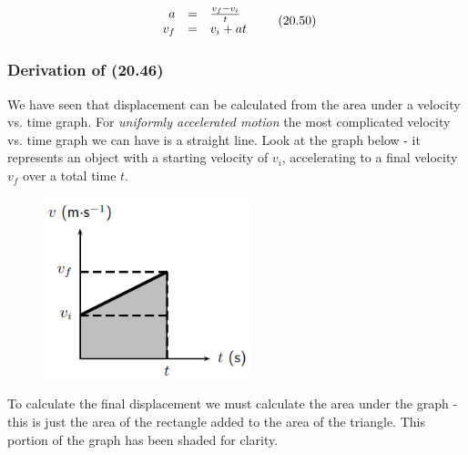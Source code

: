     \begin{equation}
    \begin{array}{ccc}\hfill a& =& \frac{{v}_{f}-{v}_{i}}{t}\hfill \\ \hfill {v}_{f}& =& {v}_{i}+at\hfill \end{array}\tag{20.50}
      \end{equation}
        \label{m38796*uid136}
            \subsubsection{ Derivation of (20.46)}
            \nopagebreak
          \label{m38796*id76415}We have seen that displacement can be calculated from the area under a velocity vs. time graph. For \textsl{uniformly accelerated motion} the most complicated velocity vs. time graph we can have is a straight line. Look at the graph below - it represents an object with a starting velocity of \textsl{${v}_{i}$}, accelerating to a final velocity \textsl{${v}_{f}$} over a total time \textsl{$t$}.\par 
          \label{m38796*id76474}
    \setcounter{subfigure}{0}
	\begin{figure}[H] %
    \begin{center}
    \label{m38796*id76477!!!underscore!!!media}\label{m38796*id76477!!!underscore!!!printimage}\includegraphics[width=6cm]{col11305.imgs/m38796_PG10C2_045.png} %
      \vspace{2pt}
    \vspace{.1in}
    \end{center}
 \end{figure}       
          \par 
          \label{m38796*id76483}To calculate the final displacement we must calculate the area under the graph - this is just the area of the rectangle added to the area of the triangle. This portion of the graph has been shaded for clarity.\par 
          \label{m38796*id76488}\nopagebreak\noindent{}
            
